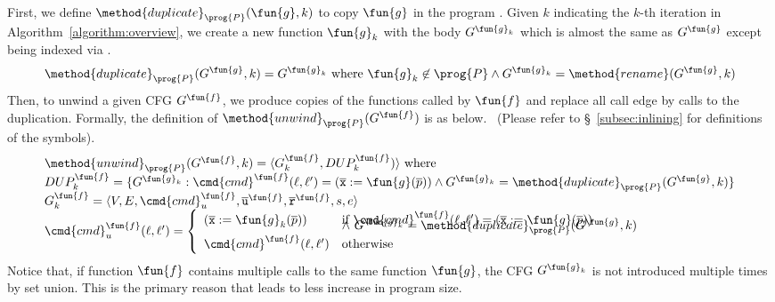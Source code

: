
First, we define $\method{duplicate}_\prog{P}(\fun{g}, k)$ to copy $\fun{g}$ in
the program .
Given $k$ indicating the $k$-th iteration in Algorithm~\ref{algorithm:overview},
we create a new function $\fun{g}_k$ with the body $G^{\fun{g}_k}$ which is
almost the same as $G^\fun{g}$ except being indexed via .
\[
  \method{duplicate}_\prog{P}(G^\fun{g}, k) = G^{\fun{g}_k} \text{ where }
  \fun{g}_k \not\in \prog{P} \land G^{\fun{g}_k}=\method{rename}(G^\fun{g}, k)
\]
Then, to unwind a given CFG $G^\fun{f}$, we produce copies of the functions
called by $\fun{f}$ and replace all call edge by calls to the duplication.
Formally, the definition of $\method{unwind}_\prog{P}(G^\fun{f})$ is as below.
~(Please refer to \S~\ref{subsec:inlining} for definitions of the symbols).
\[
\begin{array}{l}
\method{unwind}_\prog{P}(G^\fun{f}, k)
  = \langle G^\fun{f}_k, DUP^\fun{f}_k) \rangle \text{ where} \\
DUP^\fun{f}_k = \{G^{\fun{g}_k} :
    \cmd{cmd}^\fun{f}(\ell,\ell')=(\overline{\texttt{x}}:=\fun{g}(\overline{p}))
    \land G^{\fun{g}_k} = \method{duplicate}_\prog{P}(G^\fun{g}, k)
  \}\\
G^\fun{f}_k = \langle V, E,\cmd{cmd}_u^\fun{f}, \overline{\texttt{u}}^\fun{f},
      \overline{\texttt{r}}^\fun{f},s,e \rangle \\
{%
\cmd{cmd}_u^\fun{f} (\ell, \ell') =
\left\{
  \begin{array}{ll}
  (\overline{\texttt{x}}:=\fun{g}_k(\overline{p})) &\text{if } 
    \cmd{cmd}^\fun{f}(\ell,\ell')=(\overline{\texttt{x}}:=\fun{g}(\overline{p})) \\[-8pt]
  & \land\ G^{\fun{g}_k} = \method{duplicate}_\prog{P}(G^\fun{g}, k)\\
  \cmd{cmd}^\fun{f}(\ell,\ell') &\text{otherwise}
  \end{array}
\right.
}
\end{array}
\]
Notice that, if function $\fun{f}$ contains multiple calls to the same function
$\fun{g}$,
the CFG $G^{\fun{g}_k}$ is not introduced multiple times by set union.
This is the primary reason that leads to less increase in program size.

